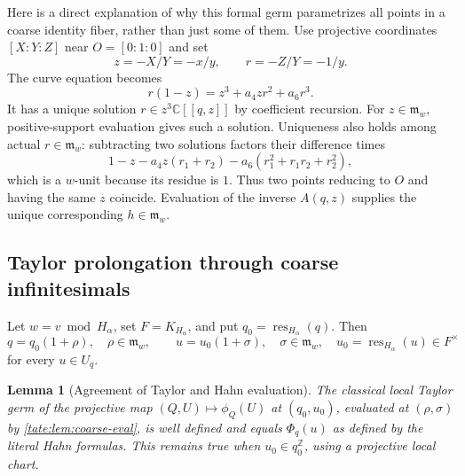 \documentclass[11pt,letterpaper]{article}
\newtheorem{lemma}[lemma]{Lemma}
\theoremstyle{definition}
\newcommand{\C}{\mathbb C}
\newcommand{\Z}{\mathbb Z}
\newcommand{\res}{\operatorname{res}}
\newcommand{\m}{\mathfrak m}
\begin{document}
Here is a direct explanation of why this formal germ parametrizes all
points in a coarse identity fiber, rather than just some of them.
Use projective coordinates $[X:Y:Z]$ near $O=[0:1:0]$ and set
\[
 z=-X/Y=-x/y,\qquad r=-Z/Y=-1/y.
\]
The curve equation becomes
\begin{equation}
 r(1-z)=z^3+a_4zr^2+a_6r^3.\label{tate:eq:localcurve}
\end{equation}
It has a unique solution $r\in z^3\C[[q,z]]$ by coefficient recursion.
For $z\in\m_w$, positive-support evaluation gives such a solution.
Uniqueness also holds among actual $r\in\m_w$: subtracting two
solutions factors their difference times
\[
 1-z-a_4z(r_1+r_2)-a_6(r_1^2+r_1r_2+r_2^2),
\]
which is a $w$-unit because its residue is $1$. Thus two points reducing
to $O$ and having the same $z$ coincide. Evaluation of the inverse
$A(q,z)$ supplies the unique corresponding $h\in\m_w$.

\subsection{Taylor prolongation through coarse infinitesimals}

Let $w=v\bmod H_\alpha$, set $F=K_{H_\alpha}$, and put
$q_0=\res_{H_\alpha}(q)$. Then
\[
 q=q_0(1+\rho),\quad \rho\in\m_w,
 \qquad
 u=u_0(1+\sigma),\quad \sigma\in\m_w,
 \quad u_0=\res_{H_\alpha}(u)\in F^\times
\]
for every $u\in U_q$.

\begin{lemma}[Agreement of Taylor and Hahn evaluation]\label{tate:lem:agreement}
The classical local Taylor germ of the projective map
$(Q,U)\mapsto\phi_Q(U)$ at $(q_0,u_0)$, evaluated at
$(\rho,\sigma)$ by \cref{tate:lem:coarse-eval}, is well defined and equals
$\Phi_q(u)$ as defined by the literal Hahn formulas.
This remains true when $u_0\in q_0^\Z$, using a projective local chart.
\end{lemma}
\end{document}
